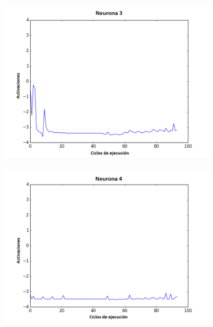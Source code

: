 \begin{figure}[!h]
\begin{subfigure}{0.33\textwidth}
  \includegraphics[width=\linewidth]{Imagenes/Agente2Activaciones/Agente2/Neurona2}
\end{subfigure}
\medskip
\begin{subfigure}{0.33\textwidth}
  \includegraphics[width=\linewidth]{Imagenes/Agente2Activaciones/Agente2/Neurona3}
\end{subfigure}\hfil %
\begin{subfigure}{0.33\textwidth}

\end{subfigure}
\end{figure}
